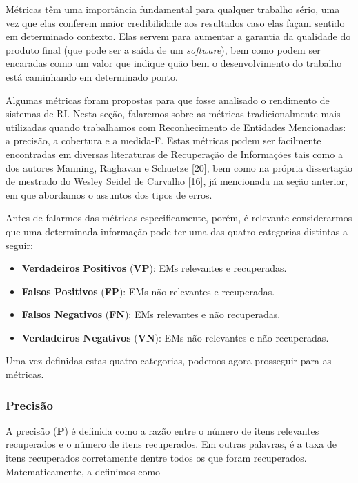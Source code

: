 \documentclass[11pt]{report}
\begin{document}
\indent\indent Métricas têm uma importância fundamental para qualquer trabalho sério, uma vez que elas conferem maior credibilidade aos resultados caso elas façam
sentido em determinado contexto. Elas servem para aumentar a garantia da qualidade do produto final (que pode ser a saída de um \textit{software}), bem como podem
ser encaradas como um valor que indique quão bem o desenvolvimento do trabalho está caminhando em determinado ponto.

Algumas métricas foram propostas para que fosse analisado o rendimento de sistemas de RI. Nesta seção, falaremos sobre as métricas tradicionalmente mais utilizadas quando trabalhamos
com Reconhecimento de Entidades Mencionadas: a precisão, a cobertura e a medida-F. Estas métricas podem ser facilmente encontradas em diversas literaturas de
Recuperação de Informações tais como a dos autores Manning, Raghavan e Schuetze [20], bem como na própria dissertação de mestrado do Wesley Seidel de Carvalho [16], já mencionada na seção anterior, em que abordamos o assuntos dos tipos de erros.

Antes de falarmos das métricas especificamente, porém, é relevante considerarmos que uma determinada informação pode ter uma das quatro categorias distintas a seguir:

\begin{itemize}
 \item \textbf{Verdadeiros Positivos} (\textbf{VP}): EMs relevantes e recuperadas.
 \item \textbf{Falsos Positivos} (\textbf{FP}): EMs não relevantes e recuperadas.
 \item \textbf{Falsos Negativos} (\textbf{FN}): EMs relevantes e não recuperadas.
 \item \textbf{Verdadeiros Negativos} (\textbf{VN}): EMs não relevantes e não recuperadas.
\end{itemize}

Uma vez definidas estas quatro categorias, podemos agora prosseguir para as métricas.

\subsubsection{Precisão}

\indent\indent A precisão (\textbf{P}) é definida como a razão entre o número de itens relevantes recuperados e o número de itens recuperados.
Em outras palavras, é a taxa de itens recuperados corretamente dentre todos os que foram recuperados. Matematicamente, a definimos como
\end{document}
